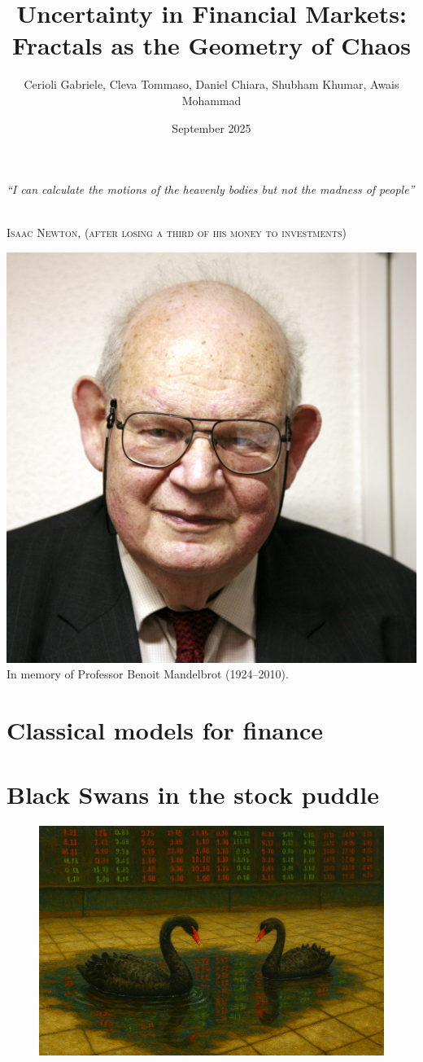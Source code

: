\documentclass[english]{article}
\title{Uncertainty in Financial Markets: Fractals as the Geometry of Chaos}
\author{Cerioli Gabriele, Cleva Tommaso, Daniel Chiara, Shubham Khumar, Awais Mohammad}
\date{September 2025}
\begin{document}
\maketitle

\vspace{1cm}
\begin{center}
    \epigraph{\large\textit{“I can calculate the motions of the heavenly bodies but not the madness of people”}%
    \normalsize\ }%
{\large\scshape Isaac Newton, {\ttfamily (after losing a third of his money to investments)}}
\end{center}


\vfill
\begin{center}
    \includegraphics[width=0.5\linewidth]{img/mandelbrot.jpg}\\[0.3cm]
    \huge In memory of Professor Benoit Mandelbrot (1924--2010).\\
\end{center}


\newpage
\tableofcontents

\newpage
\section{Classical models for finance}


\section{Black Swans in the stock puddle}

\begin{figure}[H]
    \centering
    \includegraphics[width=0.65\linewidth]{img/Copilot_20250925_235000.png}
\end{figure}

\end{document}
